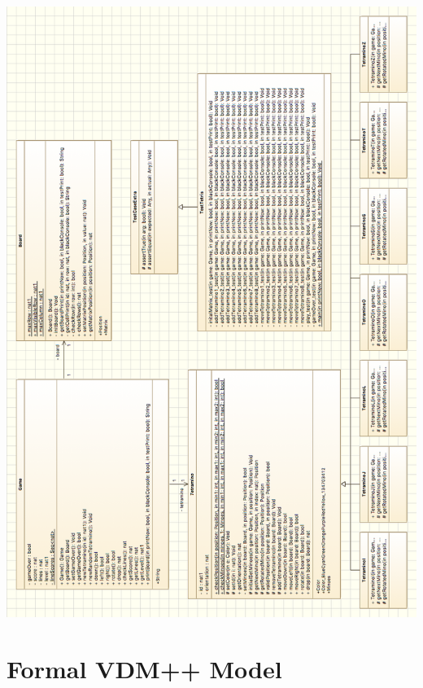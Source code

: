 \documentclass[a4paper]{article}
\begin{document}
\begin{center}
	\includegraphics[scale=0.55]{resources/img/uml}
	\label{uml}
\end{center}
\restoregeometry

\section{Formal VDM++ Model}
\end{document}
